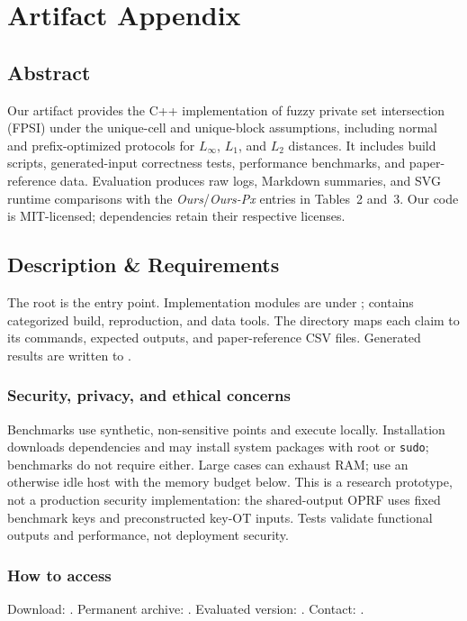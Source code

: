 \section{Artifact Appendix}

\subsection{Abstract}
Our artifact provides the C++ implementation of fuzzy private set
intersection (FPSI) under the unique-cell and unique-block assumptions,
including normal and prefix-optimized protocols for $L_\infty$, $L_1$,
and $L_2$ distances. It includes build scripts, generated-input correctness
tests, performance benchmarks, and paper-reference data. Evaluation produces
raw logs, Markdown summaries, and SVG runtime comparisons with the
\emph{Ours}/\emph{Ours-Px} entries in Tables~2 and~3. Our code is MIT-licensed;
dependencies retain their respective licenses.

\subsection{Description \& Requirements}
The root  is the entry point. Implementation modules are
under ;  contains categorized build,
reproduction, and data tools. The  directory maps each claim to its commands,
expected outputs, and paper-reference CSV files. Generated results are
written to .

\subsubsection{Security, privacy, and ethical concerns}
Benchmarks use synthetic, non-sensitive points and execute locally. Installation
downloads dependencies and may install system packages with root or
\texttt{sudo}; benchmarks do not require either. Large cases can exhaust RAM;
use an otherwise idle host with the memory budget below. This is a research
prototype, not a production security implementation: the shared-output OPRF
uses fixed benchmark keys and preconstructed key-OT inputs. Tests validate
functional outputs and performance, not deployment security.

\subsubsection{How to access}
Download: \ArtifactURL. Permanent archive: \ArtifactDOI.
Evaluated version: \ArtifactVersion. Contact: \ArtifactContact.

